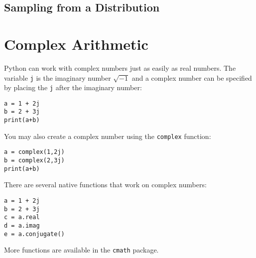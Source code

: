 \subsection*{Sampling from a Distribution}

\section{Complex Arithmetic}
Python can work with complex numbers just as easily as real numbers.
The variable \texttt{j} is the imaginary number $\sqrt{-1}$ and a
complex number can be specified by placing the \texttt{j} after the
imaginary number:
\begin{Verbatim}
a = 1 + 2j
b = 2 + 3j
print(a+b)
\end{Verbatim}
You may also create a complex number using the \texttt{complex}
function:
\begin{Verbatim}
a = complex(1,2j)
b = complex(2,3j)
print(a+b)
\end{Verbatim}
There are several native functions that work on complex numbers:
\begin{Verbatim}
a = 1 + 2j
b = 2 + 3j
c = a.real
d = a.imag
e = a.conjugate()
\end{Verbatim}
More functions are available in the \texttt{cmath} package.
